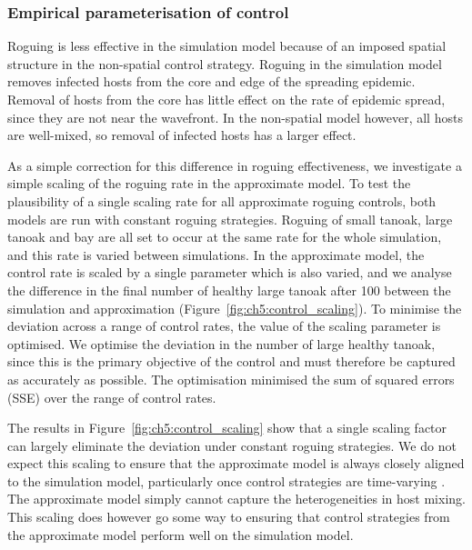 \subsubsection{Empirical parameterisation of control}

Roguing is less effective in the simulation model because of an imposed spatial structure in the non-spatial control strategy. Roguing in the simulation model removes infected hosts from the core and edge of the spreading epidemic. Removal of hosts from the core has little effect on the rate of epidemic spread, since they are not near the wavefront. In the non-spatial model however, all hosts are well-mixed, so removal of infected hosts has a larger effect.

As a simple correction for this difference in roguing effectiveness, we investigate a simple scaling of the roguing rate in the approximate model. To test the plausibility of a single scaling rate for all approximate roguing controls, both models are run with constant roguing strategies. Roguing of small tanoak, large tanoak and bay are all set to occur at the same rate for the whole simulation, and this rate is varied between simulations. In the approximate model, the control rate is scaled by a single parameter which is also varied, and we analyse the difference in the final number of healthy large tanoak after \SI{100}{\years} between the simulation and approximation (Figure~\ref{fig:ch5:control_scaling}). To minimise the deviation across a range of control rates, the value of the scaling parameter is optimised. We optimise the deviation in the number of large healthy tanoak, since this is the primary objective of the control and must therefore be captured as accurately as possible. The optimisation minimised the sum of squared errors (SSE) over the range of control rates.

The results in Figure~\ref{fig:ch5:control_scaling} show that a single scaling factor can largely eliminate the deviation under constant roguing strategies. We do not expect this scaling to ensure that the approximate model is always closely aligned to the simulation model, particularly once control strategies are time-varying . The approximate model simply cannot capture the heterogeneities in host mixing. This scaling does however go some way to ensuring that control strategies from the approximate model perform well on the simulation model.

